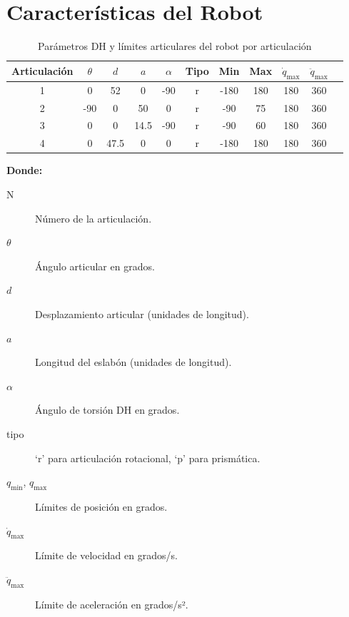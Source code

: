 \section{Características del Robot} \label{sec:caracteristicas_del_robot}

\begin{table}[H]
	\centering
	\begin{tabular}{|c|c|c|c|c|c|c|c|c|c|c|}
		\hline
		Articulación & $\theta$ & $d$ & $a$ & $\alpha$ & Tipo & Min & Max & $\dot{q}_{\text{max}}$ & $\ddot{q}_{\text{max}}$ \\
		\hline
		1 & 0     & 52   & 0    & -90   & r & -180 & 180 & 180 & 360 \\
		2 & -90  & 0    & 50   & 0     & r & -90  & 75  & 180 & 360 \\
		3 & 0     & 0    & 14.5 & -90   & r & -90  & 60  & 180 & 360 \\
		4 & 0     & 47.5 & 0    & 0     & r & -180 & 180 & 180 & 360 \\
		\hline
	\end{tabular}
	\caption{Parámetros DH y límites articulares del robot por articulación}
	\label{tab:parametros_dh_articulaciones}
\end{table}

\bigskip
\noindent
\textbf{Donde:}
\begin{description}
	\item[N] Número de la articulación.
	\item[\(\theta\)] Ángulo articular en grados.
	\item[\(d\)] Desplazamiento articular (unidades de longitud).
	\item[\(a\)] Longitud del eslabón (unidades de longitud).
	\item[\(\alpha\)] Ángulo de torsión DH en grados.
	\item[tipo] ‘r’ para articulación rotacional, ‘p’ para prismática.
	\item[\(q_{\min}\), \(q_{\max}\)] Límites de posición en grados.
	\item[\(\dot q_{\max}\)] Límite de velocidad en grados/s.
	\item[\(\ddot q_{\max}\)] Límite de aceleración en grados/s².

\end{description}

